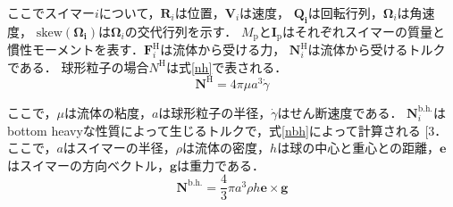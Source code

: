 \documentclass[twocolumns,10pt,a4j]{jarticle}
\makeatletter
\DeclareRobustCommand\cite{\unskip
  \@ifnextchar[{\@tempswatrue\@citex}{\@tempswafalse\@citex[]}}
\makeatother
\begin{document}
  \noindent
ここでスイマー$i$について，$\boldsymbol{R}_i$は位置，$\boldsymbol{V}_i$は速度，
$\boldsymbol{Q_i}$は回転行列，$\boldsymbol{\Omega}_i$は角速度，
$\mathrm{skew} (\boldsymbol{\Omega_i})$は$\boldsymbol{\Omega}_i$の交代行列を示す．
$M_\mathrm{p}$と$\boldsymbol{I}_\mathrm{p}$はそれぞれスイマーの質量と慣性モーメントを表す．$\boldsymbol{F}_i^\mathrm{H}$は流体から受ける力，
$\boldsymbol{N}_i^\mathrm{H}$は流体から受けるトルクである．
球形粒子の場合$N^\mathrm{H}$は式\eqref{nh}で表される．
  \vspace{-3truemm}
  \begin{equation}
    \boldsymbol{N^\mathrm{H}} = 4 \pi \mu a^3 \dot{\gamma}
    \label{nh}
  \end{equation}
  \vspace{-6truemm}

\noindent
ここで，$\mu$は流体の粘度，$a$は球形粒子の半径，$\dot{\gamma}$はせん断速度である．
$\boldsymbol{N}_i^\mathrm{b.h.}$はbottom heavyな性質によって生じるトルクで，式\eqref{nbh}によって計算される\cite{3}．
ここで，$a$はスイマーの半径，$\rho$は流体の密度，$h$は球の中心と重心との距離，$\boldsymbol{e}$はスイマーの方向ベクトル，$\boldsymbol{g}$は重力である．
  \vspace{-3truemm}
  \begin{equation}
    \boldsymbol{N}^\mathrm{b.h.} = \frac{4}{3} \pi a^3 \rho h \boldsymbol{e} \times \boldsymbol{g}
    \label{nbh}
  \end{equation}
  \vspace{-4truemm}

\end{document}
